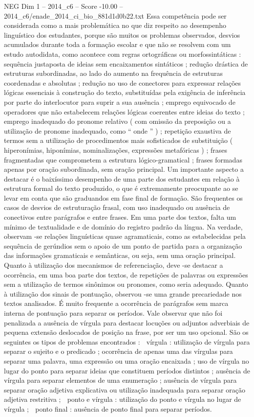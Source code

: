 \begin{textsample}{NEG Dim 1 – 2014\_c6 – Score -10.00 – 2014\_c6/enade\_2014\_ci\_bio\_881d1d0b22.txt}
Essa competência pode ser considerada como a mais problemática no que diz respeito ao desempenho linguístico dos estudantes, porque são muitos os problemas observados, desvios acumulados durante toda a formação escolar e que não se resolvem com um estudo autodidata, como acontece com regras ortográficas ou morfossintáticas : sequência justaposta de ideias sem encaixamentos sintáticos ; redução drástica de estruturas subordinadas, ao lado do aumento na frequência de estruturas coordenadas e absolutas ; redução no uso de conectores para expressar relações lógicas essenciais à construção do texto, substituídas pela exigência de inferência por parte do interlocutor para suprir a sua ausência ; emprego equivocado de operadores que não estabelecem relações lógicas coerentes entre ideias do texto ; emprego inadequado do pronome relativo ( com omissão da preposição ou a utilização de pronome inadequado, como “ onde ” ) ; repetição exaustiva de termos sem a utilização de procedimentos mais sofisticados de substituição ( hiperonímias, hiponímias, nominalizações, expressões metafóricas ) ; frases fragmentadas que comprometem a estrutura lógico-gramatical ; frases formadas apenas por oração subordinada, sem oração principal.
Um importante aspecto a destacar é o baixíssimo desempenho de uma parte dos estudantes em relação à estrutura formal do texto produzido, o que é extremamente preocupante ao se levar em conta que são graduandos em fase final de formação.
São frequentes os casos de desvios de estruturação frasal, com uso inadequado ou ausência de conectivos entre parágrafos e entre frases.
Em uma parte dos textos, falta um mínimo de textualidade e de domínio do registro padrão da língua.
Na verdade, observam -se relações linguísticas quase agramaticais, como as estabelecidas pela sequência de gerúndios sem o apoio de um ponto de partida para a organização das informações gramaticais e semânticas, ou seja, sem uma oração principal.
Quanto à utilização dos mecanismos de referenciação, deve -se destacar a ocorrência, em uma boa parte dos textos, de repetições de palavras ou expressões sem a utilização de termos sinônimos ou pronomes, como seria adequado.
Quanto à utilização dos sinais de pontuação, observou -se uma grande precariedade nos textos analisados.
É muito frequente a ocorrência de parágrafos sem marca interna de pontuação para separar os períodos.
Vale observar que não foi penalizada a ausência de vírgula para destacar locuções ou adjuntos adverbiais de pequena extensão deslocados de posição na frase, por ser um uso opcional.
São os seguintes os tipos de problemas encontrados :  vírgula : utilização de vírgula para separar o sujeito e o predicado ; ocorrência de apenas uma das vírgulas para separar uma palavra, uma expressão ou uma oração encaixada ; uso de vírgula no lugar do ponto para separar ideias que constituem períodos distintos ; ausência de vírgula para separar elementos de uma enumeração ; ausência de vírgula para separar oração adjetiva explicativa ou utilização inadequada para separar oração adjetiva restritiva ;  ponto e vírgula : utilização do ponto e vírgula no lugar de vírgula ;  ponto final : ausência de ponto final para separar períodos.

\end{textsample}
